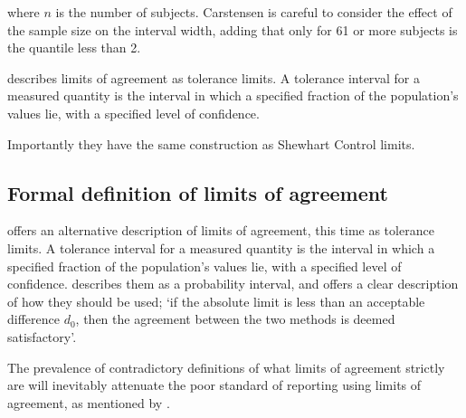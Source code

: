 \documentclass[Main.tex]{subfiles}
\begin{document}
	
	\noindent where $n$ is the number of subjects. Carstensen is
	careful to consider the effect of the sample size on the interval
	width, adding that only for 61 or more subjects is the
	quantile less than 2.
	



	
	\citet{luiz} describes limits of agreement as tolerance limits. A
	tolerance interval for a measured quantity is the interval in
	which a specified fraction of the population's values lie, with a
	specified level of confidence.
	

	
	

	Importantly they have the same construction as Shewhart Control
	limits.

\subsection{Formal definition of limits of agreement}





\citet{luiz} offers an alternative description of limits of
agreement, this time as tolerance limits. A tolerance interval for
a measured quantity is the interval in which a specified fraction
of the population's values lie, with a specified level of
confidence. \citet{Barnhart} describes them as a probability
interval, and offers a clear description of how they should be
used; `if the absolute limit is less than an acceptable difference
$d_{0}$, then the agreement between the two methods is deemed
satisfactory'.

The prevalence of contradictory definitions of what limits of agreement strictly are will inevitably attenuate the poor standard of reporting using limits of agreement, as mentioned by \citet{mantha}.
\end{document}

